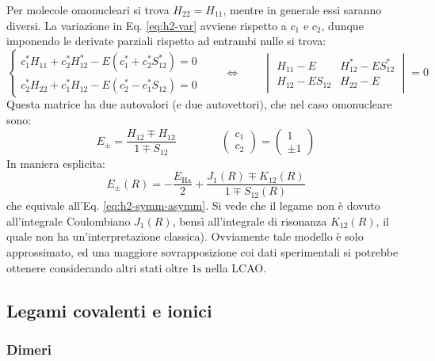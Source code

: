 Per molecole omonucleari si trova $ H_{22} = H_{11} $, mentre in generale essi saranno diversi.
La variazione in Eq. \ref{eq:h2-var} avviene rispetto a $ c_1 $ e $ c_2 $, dunque imponendo le derivate parziali rispetto ad entrambi nulle si trova:
\begin{equation*}
	\begin{cases}
		c_1^* H_{11} + c_2^* H_{12}^* - E (c_1^* + c_2^* S_{12}^*) = 0 \\
		c_2^* H_{22} + c_1^* H_{12} - E (c_2^* - c_1^* S_{12}) = 0
	\end{cases}
	\qquad \iff \qquad
	\begin{vmatrix}
		H_{11} - E & H_{12}^* - E S_{12}^* \\
		H_{12} - E S_{12} & H_{22} - E
	\end{vmatrix}
	= 0
\end{equation*}
Questa matrice ha due autovalori (e due autovettori), che nel caso omonucleare sono:
\begin{equation*}
	E_\pm = \frac{H_{12} \mp H_{12}}{1 \mp S_{12}}
	\qquad \qquad
	\begin{pmatrix}
		c_1 \\ c_2
	\end{pmatrix}
	=
	\begin{pmatrix}
		1 \\ \pm 1
	\end{pmatrix}
\end{equation*}
In maniera esplicita:
\begin{equation}
	E_\pm(R) = - \frac{E_\text{Ha}}{2} + \frac{J_{1}(R) \mp K_{12}(R)}{1 \mp S_{12}(R)}
\end{equation}
che equivale all'Eq. \ref{eq:h2-symm-asymm}. Si vede che il legame non è dovuto all'integrale Coulombiano $ J_1(R) $, bensì all'integrale di risonanza $ K_{12}(R) $, il quale non ha un'interpretazione classica). Ovviamente tale modello è solo approssimato, ed una maggiore sovrapposizione coi dati sperimentali si potrebbe ottenere considerando altri stati oltre $ \text{1s} $ nella LCAO.

\subsection{Legami covalenti e ionici}

\subsubsection{Dimeri}

